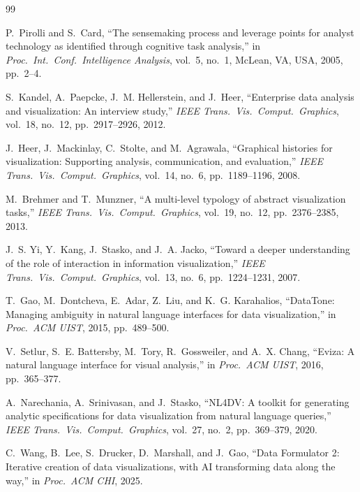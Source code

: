 \documentclass[journal]{IEEEtran}
\begin{document}
\begin{thebibliography}{99}

P.~Pirolli and S.~Card, ``The sensemaking process and leverage points for analyst technology as identified through cognitive task analysis,'' in \emph{Proc.\ Int.\ Conf.\ Intelligence Analysis}, vol.~5, no.~1, McLean, VA, USA, 2005, pp.\ 2--4.

S.~Kandel, A.~Paepcke, J.~M. Hellerstein, and J.~Heer, ``Enterprise data analysis and visualization: An interview study,'' \emph{IEEE Trans.\ Vis.\ Comput.\ Graphics}, vol.~18, no.~12, pp.\ 2917--2926, 2012.

J.~Heer, J.~Mackinlay, C.~Stolte, and M.~Agrawala, ``Graphical histories for visualization: Supporting analysis, communication, and evaluation,'' \emph{IEEE Trans.\ Vis.\ Comput.\ Graphics}, vol.~14, no.~6, pp.\ 1189--1196, 2008.

M.~Brehmer and T.~Munzner, ``A multi-level typology of abstract visualization tasks,'' \emph{IEEE Trans.\ Vis.\ Comput.\ Graphics}, vol.~19, no.~12, pp.\ 2376--2385, 2013.

J.~S. Yi, Y.~Kang, J.~Stasko, and J.~A. Jacko, ``Toward a deeper understanding of the role of interaction in information visualization,'' \emph{IEEE Trans.\ Vis.\ Comput.\ Graphics}, vol.~13, no.~6, pp.\ 1224--1231, 2007.

T.~Gao, M.~Dontcheva, E.~Adar, Z.~Liu, and K.~G. Karahalios, ``DataTone: Managing ambiguity in natural language interfaces for data visualization,'' in \emph{Proc.\ ACM UIST}, 2015, pp.\ 489--500.

V.~Setlur, S.~E. Battersby, M.~Tory, R.~Gossweiler, and A.~X. Chang, ``Eviza: A natural language interface for visual analysis,'' in \emph{Proc.\ ACM UIST}, 2016, pp.\ 365--377.

A.~Narechania, A.~Srinivasan, and J.~Stasko, ``NL4DV: A toolkit for generating analytic specifications for data visualization from natural language queries,'' \emph{IEEE Trans.\ Vis.\ Comput.\ Graphics}, vol.~27, no.~2, pp.\ 369--379, 2020.

C.~Wang, B.~Lee, S.~Drucker, D.~Marshall, and J.~Gao, ``Data Formulator 2: Iterative creation of data visualizations, with AI transforming data along the way,'' in \emph{Proc.\ ACM CHI}, 2025.


\end{thebibliography}
\end{document}
